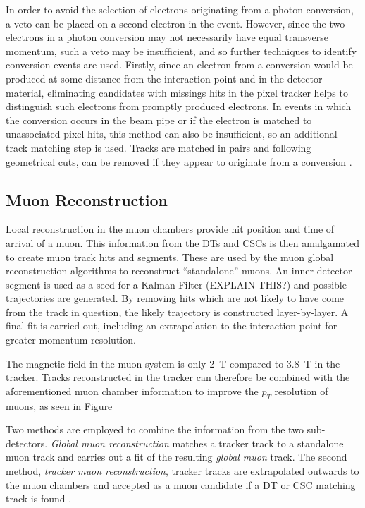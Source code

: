 In order to avoid the selection of electrons originating from a photon conversion, a veto can be placed on a
second electron in the event. However, since the two electrons in a photon conversion may not necessarily have
equal transverse momentum, such a veto may be insufficient, and so further techniques to identify conversion
events are used. Firstly, since an electron from a conversion would be produced at some distance from the
interaction point and in the detector material, eliminating candidates with missings hits in the pixel tracker
helps to distinguish such electrons from promptly produced electrons. In events in which the conversion occurs
in the beam pipe or if the electron is matched to unassociated pixel hits, this method can also be
insufficient, so an additional track matching step is used. Tracks are matched in pairs and following
geometrical cuts, can be removed if they appear to originate from a conversion \cite{electron_reconstruction}.

\subsection{Muon Reconstruction}
\label{ss:muon_reconstruction}
Local reconstruction in the muon chambers provide hit position and time of arrival of a muon. This information
from the DTs and CSCs is then amalgamated to create muon track hits and segments. These are used by the muon
global reconstruction algorithms to reconstruct ``standalone'' muons. An inner detector segment is used as a
seed for a Kalman Filter (EXPLAIN THIS?) \cite{kalman_filter} and possible trajectories are generated. By
removing hits which are not likely to have come from the track in question, the likely trajectory is
constructed layer-by-layer. A final fit is carried out, including an extrapolation to the interaction point
for greater momentum resolution.

The magnetic field in the muon system is only 2~T compared to 3.8~T in the tracker. Tracks reconstructed in
the tracker can therefore be combined with the aforementioned muon chamber information to improve the
$p_{T}$ resolution of muons, as seen in Figure%

Two methods are employed to combine the information from the two sub-detectors. \textit{Global muon
reconstruction} matches a tracker track to a standalone muon track and carries out a fit of the resulting
\textit{global muon} track. The second method, \textit{tracker muon reconstruction}, tracker tracks are
extrapolated outwards to the muon chambers and accepted as a muon candidate if a DT or CSC matching track is
found \cite{muon_reconstruction}.

